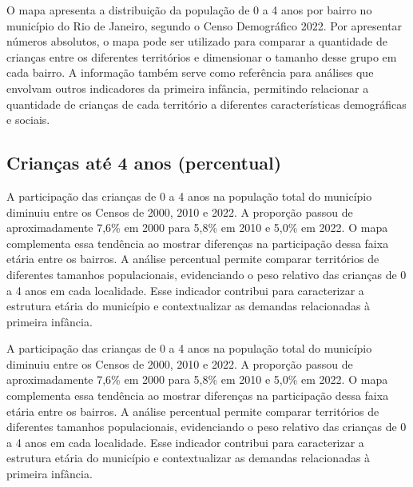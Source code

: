 O mapa apresenta a distribuição da população de 0 a 4 anos por bairro no município do Rio de Janeiro, segundo o Censo Demográfico 2022. Por apresentar números absolutos, o mapa pode ser utilizado para comparar a quantidade de crianças entre os diferentes territórios e dimensionar o tamanho desse grupo em cada bairro. A informação também serve como referência para análises que envolvam outros indicadores da primeira infância, permitindo relacionar a quantidade de crianças de cada território a diferentes características demográficas e sociais.


\subsection{Crianças até 4 anos (percentual)}


A participação das crianças de 0 a 4 anos na população total do município diminuiu entre os Censos de 2000, 2010 e 2022. A proporção passou de aproximadamente 7,6\% em 2000 para 5,8\% em 2010 e 5,0\% em 2022. O mapa complementa essa tendência ao mostrar diferenças na participação dessa faixa etária entre os bairros. A análise percentual permite comparar territórios de diferentes tamanhos populacionais, evidenciando o peso relativo das crianças de 0 a 4 anos em cada localidade. Esse indicador contribui para caracterizar a estrutura etária do município e contextualizar as demandas relacionadas à primeira infância.


A participação das crianças de 0 a 4 anos na população total do município diminuiu entre os Censos de 2000, 2010 e 2022. A proporção passou de aproximadamente 7,6\% em 2000 para 5,8\% em 2010 e 5,0\% em 2022. O mapa complementa essa tendência ao mostrar diferenças na participação dessa faixa etária entre os bairros. A análise percentual permite comparar territórios de diferentes tamanhos populacionais, evidenciando o peso relativo das crianças de 0 a 4 anos em cada localidade. Esse indicador contribui para caracterizar a estrutura etária do município e contextualizar as demandas relacionadas à primeira infância.

